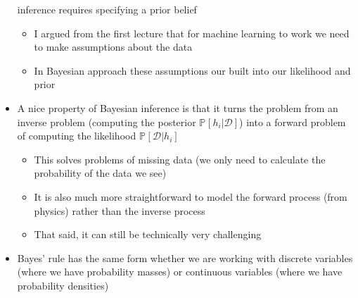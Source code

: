 \documentclass[11pt]{article}
\newcommand{\Prob}[2][]{\mathbb{P}_{#1\!}\left[ #2 \right]}
\begin{document}
\begin{itemize}
inference requires specifying a prior belief
\begin{itemize}
\item I argued from the first lecture that for machine learning to
work we need to make assumptions about the data
\item In Bayesian approach these assumptions our built into our
likelihood and prior
\end{itemize}
\item A nice property of Bayesian inference is that it turns the
problem from an inverse problem (computing the posterior
\(\Prob{h_i|\mathcal{D}}\)) into a forward problem of computing
the likelihood \(\Prob{\mathcal{D}|h_i}\)
\begin{itemize}
\item This solves problems of missing data (we only need to
calculate the probability of the data we see)
\item It is also much more straightforward to model the forward
process (from physics) rather than the inverse process
\item That said, it can still be technically very challenging
\end{itemize}
\item Bayes' rule has the same form whether we are working with
discrete variables (where we have probability masses) or
continuous variables (where we have probability densities)
\end{itemize}
\end{document}
